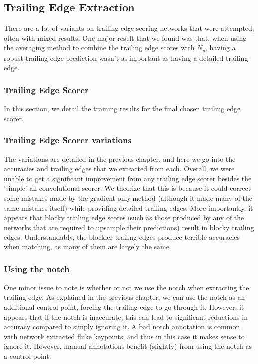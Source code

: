 
\subsection{Trailing Edge Extraction}

There are a lot of variants on trailing edge scoring networks that were attempted, often with mixed results.
One major result that we found was that, when using the averaging method to combine the trailing edge scores with $N_y$, having a robust trailing edge prediction wasn't as important as having a detailed trailing edge.

\subsubsection{Trailing Edge Scorer}

In this section, we detail the training results for the final chosen trailing edge scorer. %

\subsubsection{Trailing Edge Scorer variations}

The variations are detailed in the previous chapter, and here we go into the accuracies and trailing edges that we extracted from each.
Overall, we were unable to get a significant improvement from any trailing edge scorer besides the 'simple' all convolutional scorer.
We theorize that this is because it could correct some mistakes made by the gradient only method (although it made many of the same mistakes itself) while providing detailed trailing edges.
More importantly, it appears that blocky trailing edge scores (such as those produced by any of the networks that are required to upsample their predictions) result in blocky trailing edges. %
Understandably, the blockier trailing edges produce terrible accuracies when matching, as many of them are largely the same.

\subsubsection{Using the notch}

One minor issue to note is whether or not we use the notch when extracting the trailing edge.
As explained in the previous chapter, we can use the notch as an additional control point, forcing the trailing edge to go through it.
However, it appears that if the notch is inaccurate, this can lead to significant reductions in accuracy compared to simply ignoring it.
A bad notch annotation is common with network extracted fluke keypoints, and thus in this case it makes sense to ignore it.
However, manual annotations benefit (slightly) from using the notch as a control point.

